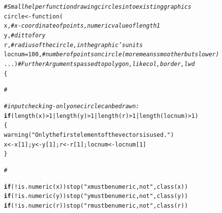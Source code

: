 \documentclass[xcolor=table,      handout ,    xcolor=dvipsnames]{beamer}\usepackage[]{graphicx}\usepackage[]{color}
\makeatletter
\newcommand{\hlnum}[1]{\textcolor[rgb]{0,0,0}{#1}}
\newcommand{\hlstr}[1]{\textcolor[rgb]{0.545,0.137,0.137}{#1}}
\newcommand{\hlcom}[1]{\textcolor[rgb]{0,0.392,0}{\textit{#1}}}
\newcommand{\hlopt}[1]{\textcolor[rgb]{0,0,0}{#1}}
\newcommand{\hlstd}[1]{\textcolor[rgb]{0,0,0}{#1}}
\newcommand{\hlkwa}[1]{\textcolor[rgb]{1,0,0}{\textbf{#1}}}
\newcommand{\hlkwb}[1]{\textcolor[rgb]{0,0,0}{#1}}
\newcommand{\hlkwd}[1]{\textcolor[rgb]{0,0,1}{#1}}
\newenvironment{kframe}{%
 \def\at@end@of@kframe{}%
 \ifinner\ifhmode%
  \def\at@end@of@kframe{\end{minipage}}%
  \begin{minipage}{\columnwidth}%
 \fi\fi%
 \def\FrameCommand##1{\hskip\@totalleftmargin \hskip-\fboxsep
 \colorbox{shadecolor}{##1}\hskip-\fboxsep
     \hskip-\linewidth \hskip-\@totalleftmargin \hskip\columnwidth}%
 \MakeFramed {\advance\hsize-\width
   \@totalleftmargin\z@ \linewidth\hsize
   \@setminipage}}%
 {\par\unskip\endMakeFramed%
 \at@end@of@kframe}
\newenvironment{knitrout}{}{} %
\makeatother
\begin{document}
\begin{frame}[fragile]
\begin{knitrout}\scriptsize
{}\color{fgcolor}\begin{kframe}
\begin{alltt}
\hlcom{# Small helper function drawing circles into existing graphics}
circle <- \hlkwd{function}(
  x, \hlcom{# x-coordinate of points, numeric value of length 1}
  y, \hlcom{# ditto for y}
  r, \hlcom{# radius of the circle, in the graphic's units}
  locnum=100, \hlcom{# number of points on \hlkwd{circle} (more means smoother but slower)}
  ...) \hlcom{# Further Arguments passed to polygon, like col, border, lwd}
 \{
  
\hlcom{ #}
\end{alltt}
\end{kframe}
\end{knitrout}
\pause \vspace{-2.5em}
\begin{knitrout}\scriptsize
{}\color{fgcolor}\begin{kframe}
\begin{alltt}
 \hlcom{# input checking - only one circle can be drawn:}
 \hlkwa{if}\hlstd{(}\hlkwd{length}\hlstd{(x)} \hlopt{>}\hlnum{1} \hlopt{|} \hlkwd{length}\hlstd{(y)} \hlopt{>}\hlnum{1} \hlopt{|} \hlkwd{length}\hlstd{(r)} \hlopt{>}\hlnum{1} \hlopt{|} \hlkwd{length}\hlstd{(locnum)} \hlopt{>}\hlnum{1}\hlstd{)}
   \hlstd{\{}
   \hlkwd{warning}\hlstd{(}\hlstr{"Only the first element of the vectors is used."}\hlstd{)}
   \hlstd{x} \hlkwb{<-} \hlstd{x[}\hlnum{1}\hlstd{]; y} \hlkwb{<-} \hlstd{y[}\hlnum{1}\hlstd{]; r} \hlkwb{<-} \hlstd{r[}\hlnum{1}\hlstd{]; locnum} \hlkwb{<-} \hlstd{locnum[}\hlnum{1}\hlstd{]}
   \hlstd{\}}

 \hlcom{#}
\end{alltt}
\end{kframe}
\end{knitrout}
\pause \vspace{-2.5em}
\begin{knitrout}\scriptsize
{}\color{fgcolor}\begin{kframe}
\begin{alltt}
 \hlkwa{if}\hlstd{(}\hlopt{!}\hlkwd{is.numeric}\hlstd{(x))} \hlkwd{stop}\hlstd{(}\hlstr{"x must be numeric, not "}\hlstd{,} \hlkwd{class}\hlstd{(x))}
 \hlkwa{if}\hlstd{(}\hlopt{!}\hlkwd{is.numeric}\hlstd{(y))} \hlkwd{stop}\hlstd{(}\hlstr{"y must be numeric, not "}\hlstd{,} \hlkwd{class}\hlstd{(y))}
 \hlkwa{if}\hlstd{(}\hlopt{!}\hlkwd{is.numeric}\hlstd{(r))} \hlkwd{stop}\hlstd{(}\hlstr{"r must be numeric, not "}\hlstd{,} \hlkwd{class}\hlstd{(r))}


\end{alltt}
\end{kframe}
\end{knitrout}
\end{frame}
\end{document}
